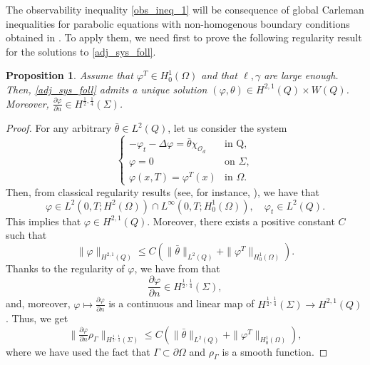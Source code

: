 \documentclass{dcds-bOF}
\newtheorem{proposition}{Proposition}
\theoremstyle{definition}
\def\csbd{\rho_{\Gamma}}
\begin{document}
The observability inequality \eqref{obs_ineq_1} will be consequence of global Carleman inequalities for parabolic equations with non-homogenous boundary conditions obtained in \cite{ima_yama_boundary}. To apply them, we need first to prove the following regularity result for the solutions to \eqref{adj_sys_foll}.

\begin{proposition}\label{prof_regularity}
Assume that $\varphi^T\in H_0^1(\Omega)$ and that $\ell,\gamma$ are large enough. Then, \eqref{adj_sys_foll} admits a unique solution $(\varphi,\theta)\in H^{2,1}(Q)\times W(Q)$. Moreover, $\frac{\partial \varphi}{\partial n}\in H^{\frac12,\frac14}(\Sigma)$.
\end{proposition}
%
\begin{proof}
For any arbitrary $\bar \theta\in L^2(Q)$, let us consider the system
%
\begin{equation}\label{heat_fixed}
\begin{cases}
-\varphi_t-\Delta \varphi=\bar\theta\chi_{\mathcal O_d} & \text{in Q}, \\
\varphi=0 &\text{on } \Sigma, \\
\varphi(x,T)=\varphi^T(x) & \text{in } \Omega.
\end{cases}
\end{equation}
%
Then, from classical regularity results (see, for instance, \cite{evans}), we have that
%
\begin{equation*}
\varphi\in L^2(0,T;H^2(\Omega))\cap L^\infty(0,T;H_0^1(\Omega)), \quad \varphi_t\in L^2(Q).
\end{equation*}
%
This implies that $\varphi\in H^{2,1}(Q)$. Moreover, there exists a positive constant $C$ such that
%
\begin{equation}\label{norm_varphi_h21}
\|\varphi\|_{H^{2,1}(Q)}\leq C\left(\|\bar \theta\|_{L^2(Q)}+\|\varphi^T\|_{H_{0}^{1}(\Omega)} \right).
\end{equation}
%
Thanks to the regularity of $\varphi$, we have from \cite[Th. 2.1, p.9]{lions_magenes} that
%
\begin{equation*}
\frac{\partial\varphi}{\partial n}\in H^{\frac12,\frac14}(\Sigma),
\end{equation*}
%
and, moreover,  $\varphi \mapsto \frac{\partial \varphi }{\partial n}$ is a continuous and linear map of $H^{\frac12,\frac14}(\Sigma)\to H^{2,1}(Q)$. Thus, we get
%
\begin{equation}\label{est_phi_h1214}
\|\tfrac{\partial \varphi}{\partial n}\csbd\|_{H^{\frac12,\frac14}(\Sigma)}\leq C\left(\|\bar \theta\|_{L^2(Q)}+\|\varphi^T\|_{H_{0}^{1}(\Omega)} \right),
\end{equation}
%
where we have used the fact that $\Gamma\subset \partial \Omega$ and $\csbd$ is a smooth function.


\end{proof}
\end{document}
